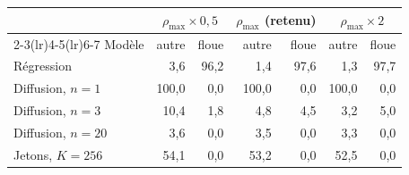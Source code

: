 \begin{tabular}{@{}lrrrrrr@{}}
\toprule
& \multicolumn{2}{c}{$\rho_{\max}\times0{,}5$} & \multicolumn{2}{c}{$\rho_{\max}$ (retenu)} & \multicolumn{2}{c}{$\rho_{\max}\times2$} \\
\cmidrule(lr){2-3}\cmidrule(lr){4-5}\cmidrule(lr){6-7}
Modèle & autre & floue & autre & floue & autre & floue \\
\midrule
Régression & 3,6 & 96,2 & 1,4 & 97,6 & 1,3 & 97,7 \\
Diffusion, $n=1$ & 100,0 & 0,0 & 100,0 & 0,0 & 100,0 & 0,0 \\
Diffusion, $n=3$ & 10,4 & 1,8 & 4,8 & 4,5 & 3,2 & 5,0 \\
Diffusion, $n=20$ & 3,6 & 0,0 & 3,5 & 0,0 & 3,3 & 0,0 \\
Jetons, $K=256$ & 54,1 & 0,0 & 53,2 & 0,0 & 52,5 & 0,0 \\
\bottomrule
\end{tabular}
